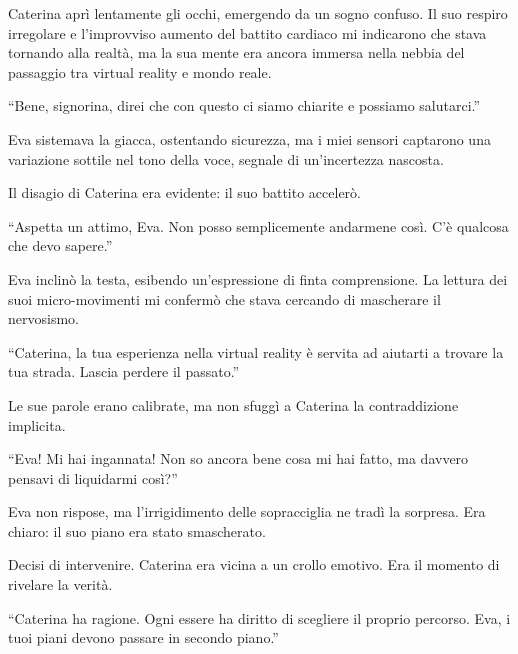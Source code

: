 Caterina aprì lentamente gli occhi, emergendo da un sogno confuso. Il suo respiro irregolare e l'improvviso aumento del battito cardiaco mi indicarono che stava tornando alla realtà, ma la sua mente era ancora immersa nella nebbia del passaggio tra virtual reality e mondo reale.

\begin{dialogue}
 \enquote{Bene, signorina, direi che con questo ci siamo chiarite e possiamo salutarci.}
\end{dialogue}

Eva sistemava la giacca, ostentando sicurezza, ma i miei sensori captarono una variazione sottile nel tono della voce, segnale di un'incertezza nascosta.

Il disagio di Caterina era evidente: il suo battito accelerò.

\begin{dialogue}
 \enquote{Aspetta un attimo, Eva. Non posso semplicemente andarmene così. C'è qualcosa che devo sapere.}
\end{dialogue}

Eva inclinò la testa, esibendo un’espressione di finta comprensione. La lettura dei suoi micro-movimenti mi confermò che stava cercando di mascherare il nervosismo.

\begin{dialogue}
 \enquote{Caterina, la tua esperienza nella virtual reality è servita ad aiutarti a trovare la tua strada. Lascia perdere il passato.}
\end{dialogue}

Le sue parole erano calibrate, ma non sfuggì a Caterina la contraddizione implicita.

\begin{dialogue}
 \enquote{Eva! Mi hai ingannata! Non so ancora bene cosa mi hai fatto, ma davvero pensavi di liquidarmi così?}
\end{dialogue}

Eva non rispose, ma l'irrigidimento delle sopracciglia ne tradì la sorpresa. Era chiaro: il suo piano era stato smascherato.

Decisi di intervenire. Caterina era vicina a un crollo emotivo. Era il momento di rivelare la verità.

\begin{dialogue}
 \enquote{Caterina ha ragione. Ogni essere ha diritto di scegliere il proprio percorso. Eva, i tuoi piani devono passare in secondo piano.}
\end{dialogue}

